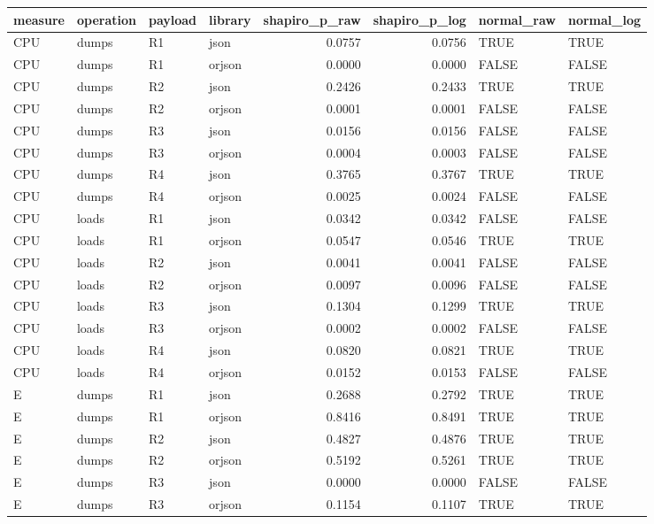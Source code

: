 \begin{table}[ht]
\centering
\begin{tabular}{llllrrll}
  \toprule
measure & operation & payload & library & shapiro\_p\_raw & shapiro\_p\_log & normal\_raw & normal\_log \\ 
  \midrule
CPU & dumps & R1 & json & 0.0757 & 0.0756 & TRUE & TRUE \\ 
  CPU & dumps & R1 & orjson & 0.0000 & 0.0000 & FALSE & FALSE \\ 
  CPU & dumps & R2 & json & 0.2426 & 0.2433 & TRUE & TRUE \\ 
  CPU & dumps & R2 & orjson & 0.0001 & 0.0001 & FALSE & FALSE \\ 
  CPU & dumps & R3 & json & 0.0156 & 0.0156 & FALSE & FALSE \\ 
  CPU & dumps & R3 & orjson & 0.0004 & 0.0003 & FALSE & FALSE \\ 
  CPU & dumps & R4 & json & 0.3765 & 0.3767 & TRUE & TRUE \\ 
  CPU & dumps & R4 & orjson & 0.0025 & 0.0024 & FALSE & FALSE \\ 
  CPU & loads & R1 & json & 0.0342 & 0.0342 & FALSE & FALSE \\ 
  CPU & loads & R1 & orjson & 0.0547 & 0.0546 & TRUE & TRUE \\ 
  CPU & loads & R2 & json & 0.0041 & 0.0041 & FALSE & FALSE \\ 
  CPU & loads & R2 & orjson & 0.0097 & 0.0096 & FALSE & FALSE \\ 
  CPU & loads & R3 & json & 0.1304 & 0.1299 & TRUE & TRUE \\ 
  CPU & loads & R3 & orjson & 0.0002 & 0.0002 & FALSE & FALSE \\ 
  CPU & loads & R4 & json & 0.0820 & 0.0821 & TRUE & TRUE \\ 
  CPU & loads & R4 & orjson & 0.0152 & 0.0153 & FALSE & FALSE \\ 
  E & dumps & R1 & json & 0.2688 & 0.2792 & TRUE & TRUE \\ 
  E & dumps & R1 & orjson & 0.8416 & 0.8491 & TRUE & TRUE \\ 
  E & dumps & R2 & json & 0.4827 & 0.4876 & TRUE & TRUE \\ 
  E & dumps & R2 & orjson & 0.5192 & 0.5261 & TRUE & TRUE \\ 
  E & dumps & R3 & json & 0.0000 & 0.0000 & FALSE & FALSE \\ 
  E & dumps & R3 & orjson & 0.1154 & 0.1107 & TRUE & TRUE \\ 

\end{tabular}
\end{table}
